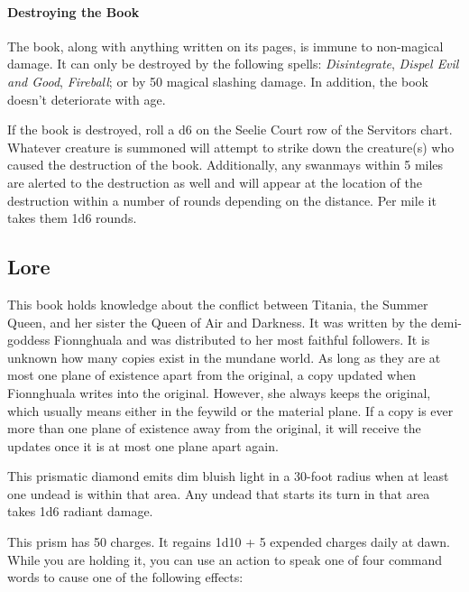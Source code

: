 \documentclass[letter,10pt,twocolumn,openany]{dndbook}
\begin{document}
\paragraph{Destroying the Book}
The book, along with anything written on its pages, is immune to non-magical damage.
It can only be destroyed by the following spells:
\textit{Disintegrate},
\textit{Dispel Evil and Good},
\textit{Fireball};
or by 50 magical slashing damage.
In addition, the book doesn't deteriorate with age.

If the book is destroyed, roll a d6 on the Seelie Court row of the Servitors chart.
Whatever creature is summoned will attempt to strike down the creature(s) who caused the destruction of the book.
Additionally, any swanmays within 5 miles are alerted to the destruction as well and will appear at the location of the destruction within a number of rounds depending on the distance.
Per mile it takes them 1d6 rounds.

\subsection{Lore}
This book holds knowledge about the conflict between Titania, the Summer Queen, and her sister the Queen of Air and Darkness.
It was written by the demi-goddess Fionnghuala and was distributed to her most faithful followers.
It is unknown how many copies exist in the mundane world.
As long as they are at most one plane of existence apart from the original,
a copy updated when Fionnghuala writes into the original.
However, she always keeps the original,
which usually means either in the feywild or the material plane.
If a copy is ever more than one plane of existence away from the original,
it will receive the updates once it is at most one plane apart again.




This prismatic diamond emits dim bluish light in a 30-foot radius when at least one undead is within that area. Any undead that starts its turn in that area takes 1d6 radiant damage.

This prism has 50 charges. It regains 1d10 + 5 expended charges daily at dawn. While you are holding it, you can use an action to speak one of four command words to cause one of the following effects:
\end{document}
